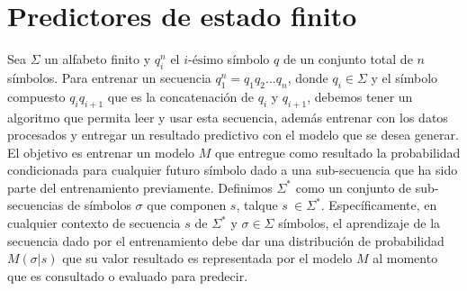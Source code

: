 




\section{Predictores de estado finito}


 

Sea $\Sigma$ un alfabeto finito y $q_{i}^{n}$ el $i\mbox{-ésimo}$ símbolo $q$ de un conjunto total de $n$ símbolos. Para entrenar un secuencia $q_{1}^{n}=q_{1}q_{2} \dots q_{n}$, donde $q_{i} \in \Sigma$ y el símbolo compuesto $q_{i}q_{i+1}$ que es la concatenación de $q_{i}$ y $q_{i+1}$, debemos tener un algoritmo que permita leer y usar esta secuencia, además entrenar con los datos procesados y entregar un resultado predictivo con el modelo que se desea generar. El objetivo es entrenar un modelo $M$ que entregue como resultado la probabilidad condicionada para cualquier futuro símbolo dado a una sub-secuencia que ha sido parte del entrenamiento previamente.
Definimos $\Sigma^{*}$ como un conjunto de sub-secuencias de símbolos $\sigma$ que componen $s$, talque $s \ \in \Sigma^{*} $. Específicamente, en cualquier contexto de secuencia $s$ de $\Sigma^{*}$  y  $\sigma \in \Sigma$ símbolos, el aprendizaje de la secuencia dado por el entrenamiento debe dar una distribución de probabilidad $M(\sigma | s )$ que su valor resultado es representada por el modelo $M$ al momento que es consultado o evaluado para predecir.

